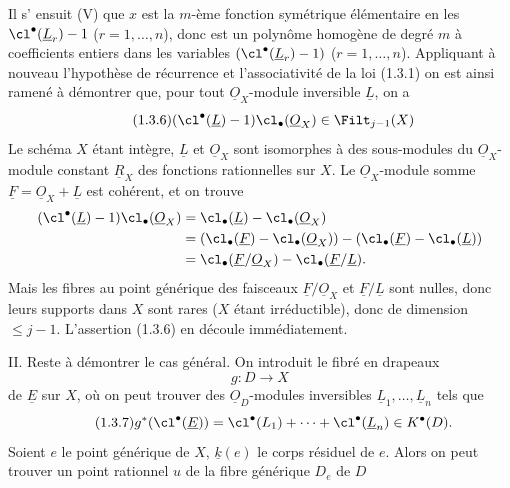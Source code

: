 
Il s'%
ensuit (V) que $x$ est la $m$-ème fonction symétrique élémentaire en les $\cl^{\bullet}(\underline{L}_r)-1$ ($r=1,\ldots,n$), donc est un polynôme homogène de degré $m$ à coefficients entiers dans les variables $(\cl^{\bullet}(\underline{L}_r)-1)$ ($r=1,\ldots,n$). Appliquant à nouveau l'hypothèse de récurrence et l'associativité de la loi (1.3.1) on est ainsi ramené à démontrer que, pour tout $\underline{O}_X$-module inversible $\underline{L}$, on a
\begin{equation}\tag{1.3.6}
(\cl^{\bullet}(\underline{L})-1)\cl_\bullet(\underline{O}_X)\in\Filt_{j-1}(X)
\end{equation}
Le schéma $X$ étant intègre, $\underline{L}$ et $\underline{O}_X$ sont isomorphes à des sous-modules du $\underline{O}_X$-module constant $\underline{R}_X$ des fonctions rationnelles sur $X$. Le $\underline{O}_X$-module somme $\underline{F}=\underline{O}_X+\underline{L}$ est cohérent, et on trouve
\begin{align*}
(\cl^{\bullet}(\underline{L})-1)\cl_\bullet(\underline{O}_X)
&=\cl_\bullet(\underline{L})-\cl_\bullet(\underline{O}_X)\\
&=(\cl_\bullet(\underline{F})-\cl_\bullet(\underline{O}_X))-(\cl_\bullet(\underline{F})-\cl_\bullet(\underline{L}))\\
&=\cl_\bullet(\underline{F}/\underline{O}_X)-\cl_\bullet(\underline{F}/\underline{L}).
\end{align*}
Mais les fibres au point générique des faisceaux $\underline{F}/\underline{O}_X$ et $\underline{F}/\underline{L}$ sont nulles, donc leurs supports dans $X$ sont rares ($X$ étant irréductible), donc de dimension $\leq j-1$. L'assertion (1.3.6) en découle immédiatement.

II. Reste à démontrer le cas général. On introduit le fibré en drapeaux
\[
g:D\longrightarrow X
\]
de $\underline{E}$ sur $X$, où on peut trouver des $\underline{O}_D$-modules inversibles $\underline{L}_1,\ldots,\underline{L}_n$ tels que
\begin{equation}\tag{1.3.7}
g^*(\cl^{\bullet}(\underline{E}))=\cl^{\bullet}(L_1)+\cdots+\cl^{\bullet}(\underline{L}_n)\in K^{\bullet}(D).
\end{equation}
Soient $e$ le point générique de $X$, $\underline{k}(e)$ le corps résiduel de $e$. Alors on peut trouver un point rationnel $u$ de la fibre générique $D_e$ de $D$ 
